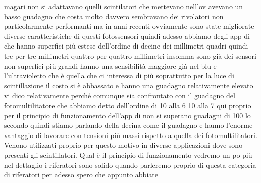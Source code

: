 {magari non si adattavano quelli scintilatori che mettevano nell'ov avevano un basso guadagno che costa molto davvero sembravano dei rivolatori non particolarmente performanti ma in anni recenti ovviamente sono state migliorate diverse caratteristiche di questi fotossensori quindi adesso abbiamo degli app di che hanno superfici più estese dell'ordine di decine dei millimetri quadri quindi tre per tre millimetri quattro per quattro millimetri insomma sono già dei sensori non superfici più grandi hanno una sensibilità maggiore già nel blu e l'ultravioletto che è quella che ci interessa di più soprattutto per la luce di scintillazione il costo si è abbassato e hanno una guadagno relativamente elevato vi dico relativamente perché comunque sia confrontato con il guadagno del fotomultilitatore che abbiamo detto dell'ordine di 10 alla 6 10 alla 7 qui proprio per il principio di funzionamento dell'app di non si superano guadagni di 100 lo secondo quindi stiamo parlando della decina come il guadagno e hanno l'enorme vantaggio di lavorare con tensioni più massi rispetto a quella dei fotomultilitatori. Venono utilizzati proprio per questo motivo in diverse applicazioni dove sono presenti gli scintillatori. Qual è il principio di funzionamento vedremo un po più nel dettaglio i riferatori sono solido quando parleremo proprio di questa categoria di riferatori per adesso spero che appunto abbiate 

}
